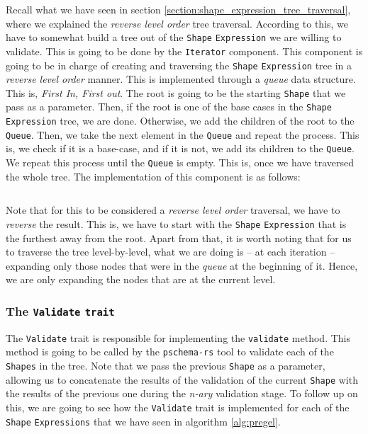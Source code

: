Recall what we have seen in section \ref{section:shape_expression_tree_traversal}, where we explained the \textit{reverse level order} tree traversal. According to this, we have to somewhat build a tree out of the \texttt{Shape} \texttt{Expression} we are willing to validate. This is going to be done by the \texttt{Iterator} component. This component is going to be in charge of creating and traversing the \texttt{Shape} \texttt{Expression} tree in a \textit{reverse level order} manner. This is implemented through a \textit{queue} data structure. This is, \textit{First In, First out}. The root is going to be the starting \texttt{Shape} that we pass as a parameter. Then, if the root is one of the base cases in the \texttt{Shape} \texttt{Expression} tree, we are done. Otherwise, we add the children of the root to the \texttt{Queue}. Then, we take the next element in the \texttt{Queue} and repeat the process. This is, we check if it is a base-case, and if it is not, we add its children to the \texttt{Queue}. We repeat this process until the \texttt{Queue} is empty. This is, once we have traversed the whole tree. The implementation of this component is as follows:

\begin{code}
    \inputminted{rust}{code/listings/11-9_tree.rs}
\end{code}

Note that for this to be considered a \textit{reverse level order} traversal, we have to \textit{reverse} the result. This is, we have to start with the \texttt{Shape} \texttt{Expression} that is the furthest away from the root. Apart from that, it is worth noting that for us to traverse the tree level-by-level, what we are doing is -- at each iteration -- expanding only those nodes that were in the \textit{queue} at the beginning of it. Hence, we are only expanding the nodes that are at the current level.

\subsubsection{The \texttt{Validate} \texttt{trait}}
\label{section:validate_trait}

The \texttt{Validate} trait is responsible for implementing the \texttt{validate} method. This method is going to be called by the \texttt{pschema-rs} tool to validate each of the \texttt{Shapes} in the tree. Note that we pass the previous \texttt{Shape} as a parameter, allowing us to concatenate the results of the validation of the current \texttt{Shape} with the results of the previous one during the \textit{n-ary} validation stage. To follow up on this, we are going to see how the \texttt{Validate} trait is implemented for each of the \texttt{Shape} \texttt{Expressions} that we have seen in algorithm \ref{alg:pregel}.

